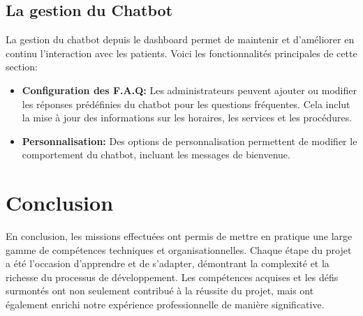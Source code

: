 \break

\subsection{La gestion du Chatbot}

\hspace{16pt} La gestion du chatbot depuis le dashboard permet de maintenir et d’améliorer en continu l’interaction avec les patients. Voici les fonctionnalités principales de cette section:

\begin{itemize}
  \item \textbf{Configuration des F.A.Q: }Les administrateurs peuvent ajouter ou modifier les réponses prédéfinies du chatbot pour les questions fréquentes. Cela inclut la mise à jour des informations sur les horaires, les services et les procédures.
  \item \textbf{Personnalisation: }Des options de personnalisation permettent de modifier le comportement du chatbot, incluant les messages de bienvenue.
\end{itemize}

\newpage

\section*{Conclusion}

\hspace{16pt}En conclusion, les missions effectuées ont permis de mettre en pratique une large gamme de compétences techniques et organisationnelles. Chaque étape du projet a été l'occasion d'apprendre et de s'adapter, démontrant la complexité et la richesse du processus de développement. Les compétences acquises et les défis surmontés ont non seulement contribué à la réussite du projet, mais ont également enrichi notre expérience professionnelle de manière significative.

\pagebreak
